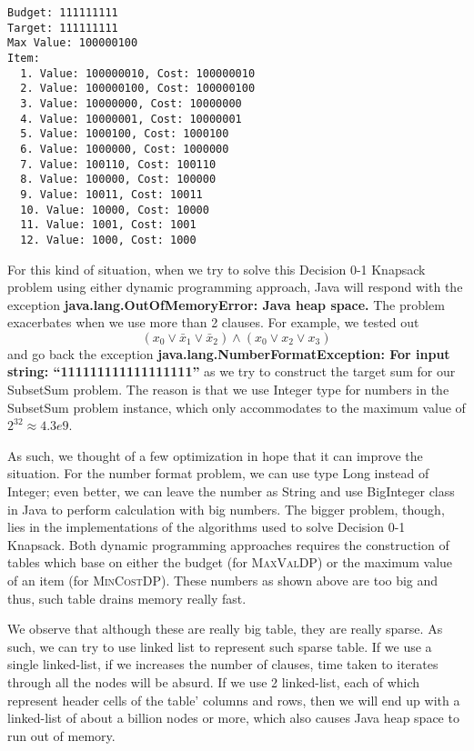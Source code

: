 \documentclass[12pt, oneside]{book}
\begin{document}
\begin{verbatim}
Budget: 111111111
Target: 111111111
Max Value: 100000100
Item:
  1. Value: 100000010, Cost: 100000010
  2. Value: 100000100, Cost: 100000100
  3. Value: 10000000, Cost: 10000000
  4. Value: 10000001, Cost: 10000001
  5. Value: 1000100, Cost: 1000100
  6. Value: 1000000, Cost: 1000000
  7. Value: 100110, Cost: 100110
  8. Value: 100000, Cost: 100000
  9. Value: 10011, Cost: 10011
  10. Value: 10000, Cost: 10000
  11. Value: 1001, Cost: 1001
  12. Value: 1000, Cost: 1000
\end{verbatim}

For this kind of situation, when we try to solve this Decision 0-1
Knapsack problem using either dynamic programming approach, Java will
respond with the exception \textbf{java.lang.OutOfMemoryError: Java heap
space.} The problem exacerbates when we use more than 2 clauses. For
example, we tested out
\[(x_{0} \lor \bar{x}_{1} \lor \bar{x}_{2}) \land (x_{0} \lor x_{2} \lor x_{3})\]
and go back the exception \textbf{java.lang.NumberFormatException: For
input string: ``111111111111111111''} as we try to construct the target
sum for our SubsetSum problem. The reason is that we use Integer type
for numbers in the SubsetSum problem instance, which only accommodates
to the maximum value of \(2^{32} \approx 4.3e9\).

As such, we thought of a few optimization in hope that it can improve
the situation. For the number format problem, we can use type Long
instead of Integer; even better, we can leave the number as String and
use BigInteger class in Java to perform calculation with big numbers.
The bigger problem, though, lies in the implementations of the
algorithms used to solve Decision 0-1 Knapsack. Both dynamic programming
approaches requires the construction of tables which base on either the
budget (for \textsc{MaxValDP}) or the maximum value of an item (for
\textsc{MinCostDP}). These numbers as shown above are too big and thus,
such table drains memory really fast.

We observe that although these are really big table, they are really
sparse. As such, we can try to use linked list to represent such sparse
table. If we use a single linked-list, if we increases the number of
clauses, time taken to iterates through all the nodes will be absurd. If
we use 2 linked-list, each of which represent header cells of the table'
columns and rows, then we will end up with a linked-list of about a
billion nodes or more, which also causes Java heap space to run out of
memory.
\end{document}
